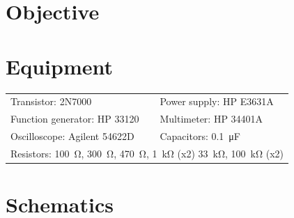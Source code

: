

\section{Objective}
\label{sec:objective}

\section{Equipment}
\label{sec:equipment}

\begin{tabular}{ll}
  \centering
  Transistor: 2N7000               & Power supply: HP E3631A            \\
  Function generator: HP 33120 & Multimeter: HP 34401A              \\
  Oscilloscope: Agilent 54622D & Capacitors: \SI{0.1}{\micro\farad} \\
  \multicolumn{2}{l}{Resistors: \SI{100}{\ohm}, \SI{300}{\ohm}, \SI{470}{\ohm}, \SI{1}{\kilo\ohm} (x2) \SI{33}{\kilo\ohm}, \SI{100}{\kilo\ohm} (x2)} \\
\end{tabular}

\section{Schematics}
\label{sec:schematics}


